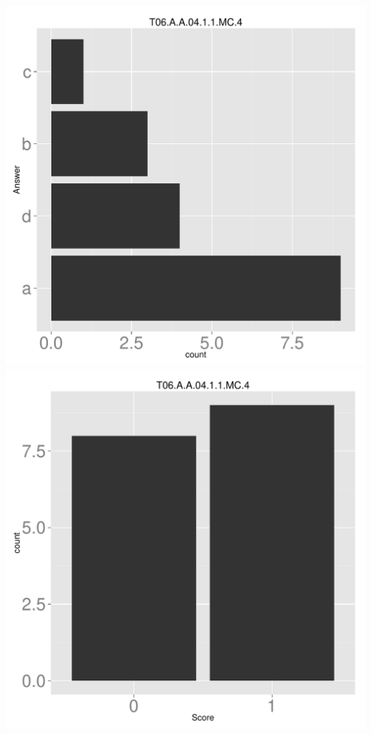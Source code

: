 \documentclass[12pt,english,nohyper]{tufte-handout}\usepackage[]{graphicx}\usepackage[]{color}
\begin{document}
\begin{center} \includegraphics[width=.45\linewidth]{Topic06_AB_4_answer} \includegraphics[width=.45\linewidth]{Topic06_AB_4_score} \end{center} 
\end{document}
